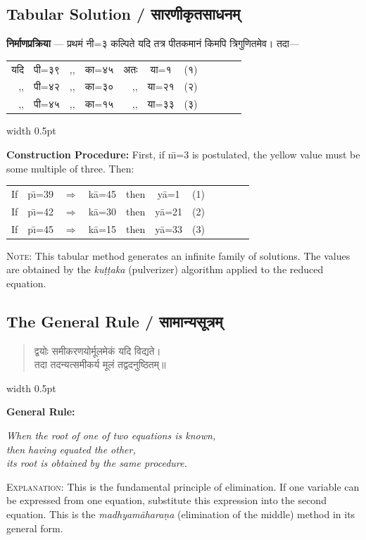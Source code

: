\documentclass[11pt,a4paper]{article}
\newcommand{\dev}[1]{{\devanagarifont #1}}
\newenvironment{sanskritverse}{%
  \begin{quote}\devanagarifont\textcolor{versecolor}%
}{%
  \end{quote}
}
\newcommand{\bilingual}[2]{%
  \par\vspace{0.5em}%
  \noindent\begin{minipage}[t]{0.47\textwidth}%
  \setlength{\parindent}{0pt}%
  \small #1%
  \end{minipage}%
  \hfill\textcolor{columnrule}{\vrule width 0.5pt}\hfill%
  \begin{minipage}[t]{0.47\textwidth}%
  \setlength{\parindent}{0pt}%
  \small\raggedright #2%
  \end{minipage}%
  \par\vspace{0.5em}%
}
\begin{document}
{\subsection*{Tabular Solution / सारणीकृतसाधनम्}

\bilingual{\textbf{निर्माणप्रक्रिया} — प्रथमं नी=३ कल्पिते यदि तत्र पीतकमानं किमपि त्रिगुणितमेव। तदा—
\begin{center}
\begin{tabular}{rclcrclcrcl}
\dev{यदि} & \dev{पी=३९} & \dev{,,} & \dev{का=४५} & \dev{अतः} & \dev{या=१} & \dev{(१)} \\
\dev{,,} & \dev{पी=४२} & \dev{,,} & \dev{का=३०} & \dev{,,} & \dev{या=२१} & \dev{(२)} \\
\dev{,,} & \dev{पी=४५} & \dev{,,} & \dev{का=१५} & \dev{,,} & \dev{या=३३} & \dev{(३)} \\
\end{tabular}
\end{center}
}{%
\textbf{Construction Procedure:} First, if n\={\i}=3 is postulated, the yellow value must be some multiple of three. Then:
\begin{center}
\begin{tabular}{rclcrclcrcl}
If & p\={\i}=39 & $\Rightarrow$ & k\={a}=45 & then & y\={a}=1 & (1)\\
If & p\={\i}=42 & $\Rightarrow$ & k\={a}=30 & then & y\={a}=21 & (2)\\
If & p\={\i}=45 & $\Rightarrow$ & k\={a}=15 & then & y\={a}=33 & (3)\\
\end{tabular}
\end{center}
\textsc{Note:} This tabular method generates an infinite family of solutions. The values are obtained by the \textit{ku\d{t}\d{t}aka} (pulverizer) algorithm applied to the reduced equation.}

\newpage

\subsection*{The General Rule / सामान्यसूत्रम्}

\bilingual{\begin{sanskritverse}
द्वयोः समीकरणयोर्मूलमेकं यदि विद्यते।\\
तदा तदन्यत्समीकर्य मूलं तद्वदनुष्ठितम्॥
\end{sanskritverse}
}{%
\textbf{General Rule:}
\begin{flushright}
\textit{When the root of one of two equations is known,}\\
\textit{then having equated the other,}\\
\textit{its root is obtained by the same procedure.}
\end{flushright}
\textsc{Explanation:} This is the fundamental principle of elimination. If one variable can be expressed from one equation, substitute this expression into the second equation. This is the \textit{madhyam\={a}hara\d{n}a} (elimination of the middle) method in its general form.}

}
\end{document}

